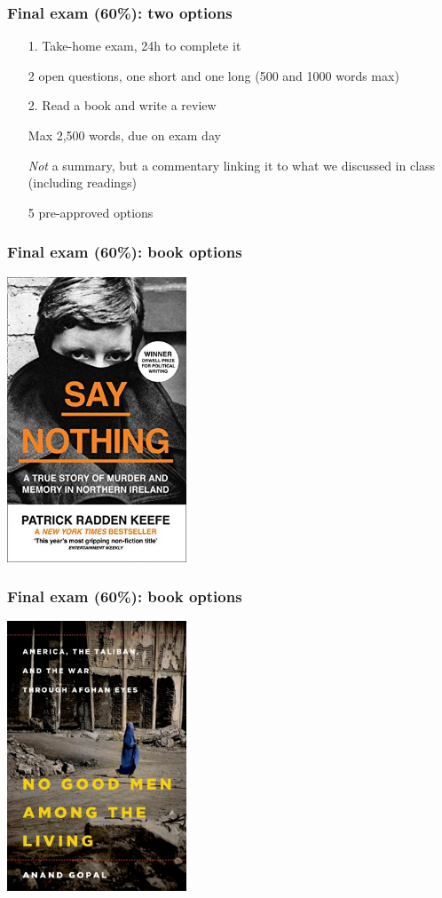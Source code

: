 \documentclass[aspectratio=43]{beamer}
\begin{document}
\begin{frame}
\frametitle{Final exam (60\%): two options}
\centering

\begin{itemize}
\item[1.] Take-home exam, 24h to complete it
\item[] 2 open questions, one short and one long (500 and 1000 words max)
\item[]
\item[2.] Read a book and write a review
\item[] Max 2,500 words, due on exam day
\item[] \textit{Not} a summary, but a commentary linking it to what we discussed in class (including readings)
\item[] 5 pre-approved options
\end{itemize}

\end{frame}


\begin{frame}
\frametitle{Final exam (60\%): book options}
\centering

\includegraphics[width = 0.4\textwidth]{img/say_nothing}

\end{frame}


\begin{frame}
\frametitle{Final exam (60\%): book options}
\centering

\includegraphics[width = 0.4\textwidth]{img/no_good_men}

\end{frame}
\end{document}
